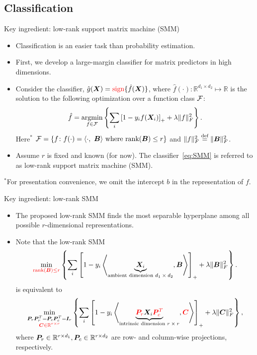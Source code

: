 \documentclass[compress,dvipsnames]{beamer}
\let\olditem\item
\renewcommand\item{\olditem\justifying}
\begin{document}
\subsection{Classification}
\begin{frame}{Key ingredient: low-rank support matrix machine (SMM)}
\begin{itemize}
\item Classification is an easier task than probability estimation. 
\item First, we develop a large-margin classifier for {\color{red} matrix predictors in high dimensions}.
\item Consider the classifier, $\hat g(\bm{X}) = {\color{red}\text{sign}}\{\hat f(\bm{X})\}$, where $\hat f(\cdot)\colon \mathbb{R}^{d_1\times d_2}\mapsto \mathbb{R}$ is the solution to the following optimization over a function class ${\mathcal F}$:
\begin{equation}\label{eq:SMM}
\hat f = \operatorname*{argmin}_{f\in{\mathcal F}}\left\{\sum_i \left[1-y_i f(\bm{X}_i)\right]_{+}+\lambda\lVert f\rVert_F^2\right\}.
\end{equation}
Here$^{*}$ ${\mathcal F}=\{f\colon f(\cdot)=\langle\cdot,\ \bm{B} \rangle \text{ where $\text{rank}(\bm{B})\leq r$}\}$ and $\lVert f\rVert_F^2\stackrel{\text{def}}{=}\lVert\bm{B}\rVert_F^2$.
\item Assume $r$ is fixed and known (for now). The classifier~\eqref{eq:SMM} is referred to as {\color{red}low-rank support matrix machine (SMM)}. 
\end{itemize}

{\scriptsize $^*$For presentation convenience, we omit the intercept $b$ in the representation of $f$.}
\end{frame}

\begin{frame}{Key ingredient: low-rank SMM}
\begin{itemize}
\item The proposed low-rank SMM finds the {\color{red}most separable hyperplane} among {\color{red}all possible $r$-dimensional representations}. 
\item Note that the low-rank SMM
\[
\min_{{\color{red}\text{rank}(\mB)\leq r}} \left\{\sum_i\left[ 1- y_i\left\langle \KeepStyleUnderBrace{\mX_i}_{\text{ambient dimension $d_1\times d_2$}}, \mB\right\rangle\right]_{+}+\lambda\FnormSize{}{\mB}^2\right\}.
\]
is equivalent to
\[
\min_{\substack{\mP_r\mP^T_r=\mP_c\mP^T_c=\mI_r \\ {\color{red}\mC\in\mathbb{R}^{r\times r}}}} \left\{\sum_i\left[ 1- y_i\left\langle \KeepStyleUnderBrace{{\color{red}\mP_r}\mX_i{\color{red}\mP^T_c}}_{\text{intrinsic dimension $r\times r$}}, {\color{red}\mC}\right\rangle\right]_{+}+\lambda\FnormSize{}{\mC}^2\right\},
\]
where $\bm{P}_r\in\mathbb{R}^{r\times d_1}, \bm{P}_c\in\mathbb{R}^{r\times d_2}$ are row- and column-wise projections, respectively. 
\end{itemize}
\end{frame}
\end{document}
